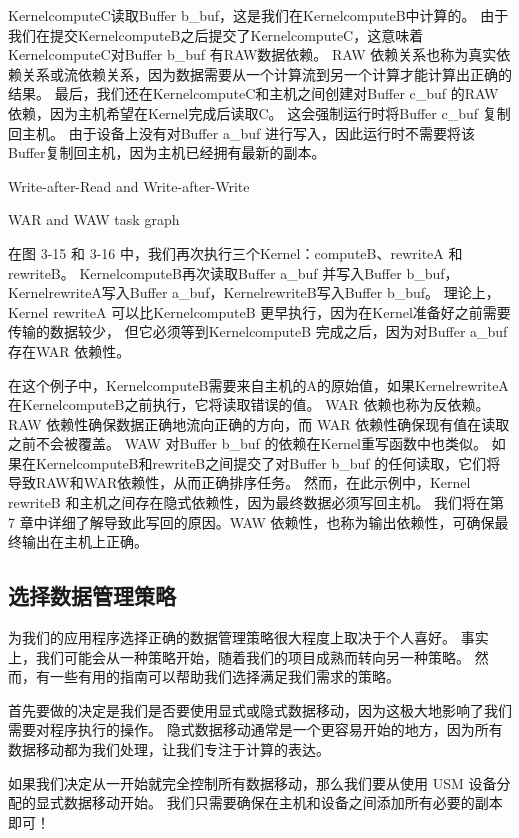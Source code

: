 KernelcomputeC读取Buffer b\_buf，这是我们在KernelcomputeB中计算的。 
由于我们在提交KernelcomputeB之后提交了KernelcomputeC，这意味着KernelcomputeC对Buffer b\_buf 有RAW数据依赖。 
RAW 依赖关系也称为真实依赖关系或流依赖关系，因为数据需要从一个计算流到另一个计算才能计算出正确的结果。 
最后，我们还在KernelcomputeC和主机之间创建对Buffer c\_buf 的RAW依赖，因为主机希望在Kernel完成后读取C。 
这会强制运行时将Buffer c\_buf 复制回主机。 
由于设备上没有对Buffer a\_buf 进行写入，因此运行时不需要将该Buffer复制回主机，因为主机已经拥有最新的副本。

{\color{red} Write-after-Read and Write-after-Write}

{\color{red} WAR and WAW task graph}

在图 3-15 和 3-16 中，我们再次执行三个Kernel：computeB、rewriteA 和 rewriteB。 
KernelcomputeB再次读取Buffer a\_buf 并写入Buffer b\_buf，
KernelrewriteA写入Buffer a\_buf，KernelrewriteB写入Buffer b\_buf。 
理论上，Kernel rewriteA 可以比KernelcomputeB 更早执行，因为在Kernel准备好之前需要传输的数据较少，
但它必须等到KernelcomputeB 完成之后，因为对Buffer a\_buf 存在WAR 依赖性。

在这个例子中，KernelcomputeB需要来自主机的A的原始值，如果KernelrewriteA在KernelcomputeB之前执行，它将读取错误的值。 
WAR 依赖也称为反依赖。 RAW 依赖性确保数据正确地流向正确的方向，而 WAR 依赖性确保现有值在读取之前不会被覆盖。 
WAW 对Buffer b\_buf 的依赖在Kernel重写函数中也类似。 
如果在KernelcomputeB和rewriteB之间提交了对Buffer b\_buf 的任何读取，它们将导致RAW和WAR依赖性，从而正确排序任务。 
然而，在此示例中，Kernel rewriteB 和主机之间存在隐式依赖性，因为最终数据必须写回主机。 
我们将在第 7 章中详细了解导致此写回的原因。WAW 依赖性，也称为输出依赖性，可确保最终输出在主机上正确。

\subsection{选择数据管理策略}
为我们的应用程序选择正确的数据管理策略很大程度上取决于个人喜好。 
事实上，我们可能会从一种策略开始，随着我们的项目成熟而转向另一种策略。 
然而，有一些有用的指南可以帮助我们选择满足我们需求的策略。

首先要做的决定是我们是否要使用显式或隐式数据移动，因为这极大地影响了我们需要对程序执行的操作。 
隐式数据移动通常是一个更容易开始的地方，因为所有数据移动都为我们处理，让我们专注于计算的表达。

如果我们决定从一开始就完全控制所有数据移动，那么我们要从使用 USM 设备分配的显式数据移动开始。 
我们只需要确保在主机和设备之间添加所有必要的副本即可！

